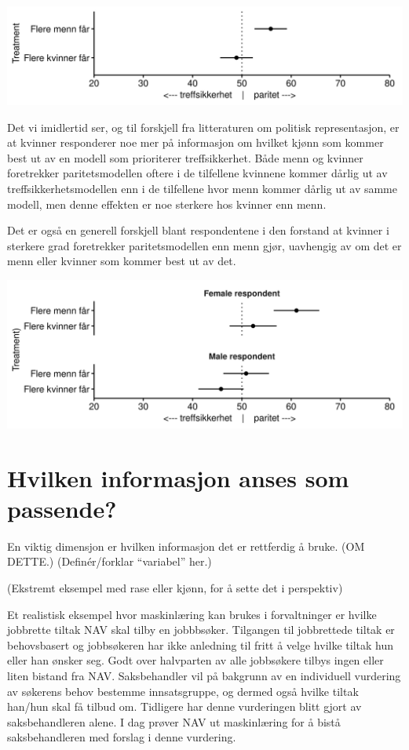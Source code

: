 \documentclass[
]{book}
\begin{document}
\includegraphics{figs/png/fig_parity_treat_avg.png}

Det vi imidlertid ser, og til forskjell fra litteraturen om politisk representasjon, er at kvinner responderer noe mer på informasjon om hvilket kjønn som kommer best ut av en modell som prioriterer treffsikkerhet.
Både menn og kvinner foretrekker paritetsmodellen oftere i de tilfellene kvinnene kommer dårlig ut av treffsikkerhetsmodellen enn i de tilfellene hvor menn kommer dårlig ut av samme modell, men denne effekten er noe sterkere hos kvinner enn menn.

Det er også en generell forskjell blant respondentene i den forstand at kvinner i sterkere grad foretrekker paritetsmodellen enn menn gjør, uavhengig av om det er menn eller kvinner som kommer best ut av det.

\includegraphics{figs/png/fig_parity_treat_avg_by_gender.png}

\hypertarget{input}{%
\chapter{Hvilken informasjon anses som passende?}\label{input}}

En viktig dimensjon er hvilken informasjon det er rettferdig å bruke.
(OM DETTE.)
(Definér/forklar ``variabel'' her.)

(Ekstremt eksempel med rase eller kjønn, for å sette det i perspektiv)

Et realistisk eksempel hvor maskinlæring kan brukes i forvaltninger er hvilke jobbrette tiltak NAV skal tilby en jobbbsøker. Tilgangen til jobbrettede tiltak er behovsbasert og jobbsøkeren har ikke anledning til fritt å velge hvilke tiltak hun eller han ønsker seg. Godt over halvparten av alle jobbsøkere tilbys ingen eller liten bistand fra NAV. Saksbehandler vil på bakgrunn av en individuell vurdering av søkerens behov bestemme innsatsgruppe, og dermed også hvilke tiltak han/hun skal få tilbud om. Tidligere har denne vurderingen blitt gjort av saksbehandleren alene. I dag prøver NAV ut maskinlæring for å bistå saksbehandleren med forslag i denne vurdering.
\end{document}

